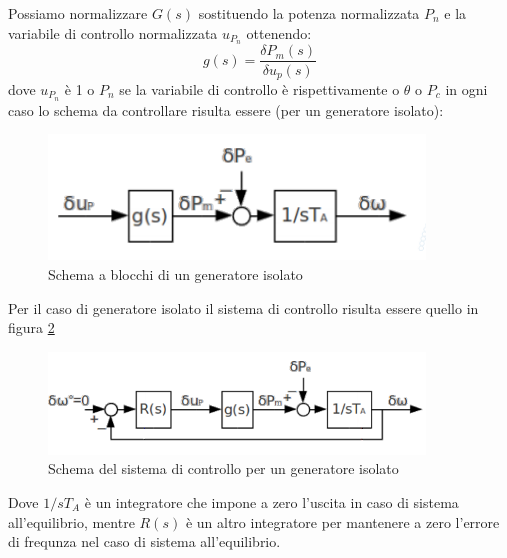 Possiamo normalizzare $G(s)$ sostituendo la potenza normalizzata $P_n$ e la variabile di controllo normalizzata $u_{P_n}$ ottenendo:
$$g(s)=\frac{\delta P_m(s)}{\delta u_p(s)}$$
dove $u_{P_n}$ è 1 o $P_n$ se la variabile di controllo è rispettivamente o $\theta$ o $P_c$ in ogni caso lo schema da controllare risulta essere (per un generatore isolato):
\begin{figure}[htb]
\centering
\includegraphics[width=10cm]{img/geniso.png}
\caption{Schema a blocchi di un generatore isolato}
\label{fig:geniso}
\end{figure}
Per il caso di generatore isolato il sistema di controllo risulta essere quello in figura \ref{fig:gencontrol}
\begin{figure}[htb]
\centering
\includegraphics[width=10cm]{img/gencontrol.png}
\caption{Schema del sistema di controllo per un generatore isolato}
\label{fig:gencontrol}
\end{figure}
Dove $1/sT_A$ è un integratore che impone a zero l'uscita in caso di sistema all'equilibrio, mentre $R(s)$ è un altro integratore per mantenere a zero l'errore di frequnza nel caso di sistema all'equilibrio.
